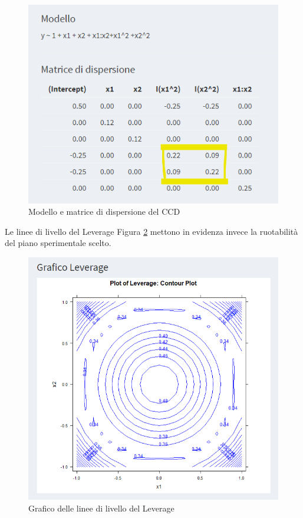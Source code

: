 \documentclass[
  11pt,
]{book}
\begin{document}
\begin{figure}[ht]

{\centering \includegraphics[width=1\linewidth]{Immagini/CCD/03_matrdisp} 

}

\caption{Modello e matrice di dispersione del CCD}\label{fig:ccd3}
\end{figure}

Le linee di livello del Leverage Figura \ref{fig:ccd4} mettono in evidenza invece la ruotabilità del piano sperimentale scelto.

\begin{figure}[ht]

{\centering \includegraphics[width=1\linewidth]{Immagini/CCD/04_livello} 

}

\caption{Grafico delle linee di livello del Leverage}\label{fig:ccd4}
\end{figure}
\end{document}
